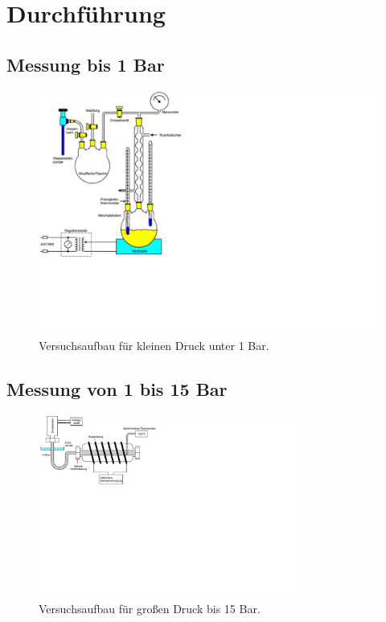 \section{Durchführung}
\label{sec:Durchführung}

\subsection{Messung bis 1 Bar}
\label{sec:Messung bis 1 Bar}

\begin{figure}
    \centering
    \includegraphics[height=8cm]{content/Bilder/Versuchsaufbau_1bar.pdf}
    \caption{Versuchsaufbau für kleinen Druck unter 1 Bar. \cite{v203}}
    \label{fig:Versuchsaufbau 1bar}
\end{figure}

\subsection{Messung von 1 bis 15 Bar}
\label{sec:Messung von 1 bis 15 Bar}

\begin{figure}
    \centering
    \includegraphics[height=6cm]{content/Bilder/Versuchsaufbau_15bar.pdf}
    \caption{Versuchsaufbau für großen Druck bis 15 Bar. \cite{v203}}
    \label{fig:Versuchsaufbau 15bar}
\end{figure}